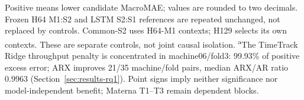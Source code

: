 \begin{table}[t]
\begin{tabular*}{\textwidth}{@{\extracolsep{\fill}}lrrrr@{}}
    \bottomrule
  \end{tabular*}
  \vspace{2pt}
  \parbox{\textwidth}{\footnotesize Positive means lower candidate MacroMAE; values are rounded to two decimals.
  Frozen H64 M1:S2 and LSTM S2:S1 references are repeated unchanged, not replaced by controls.
  Common-S2 uses H64-M1 contexts; H129 selects its own contexts. These are separate controls, not joint causal isolation.
  \textsuperscript{a}The TimeTrack Ridge throughput penalty is concentrated in machine06/fold3:
  99.93\% of positive excess error; ARX improves 21/35 machine/fold pairs, median ARX/AR ratio $0.9963$ (Section~\ref{sec:results-rq1}).
  Point signs imply neither significance nor model-independent benefit; Materna T1--T3 remain dependent blocks.}
\end{table}
